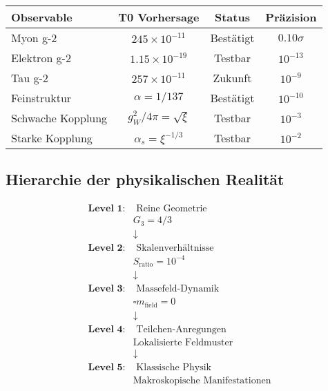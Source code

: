 \documentclass[12pt,a4paper]{article}
\begin{document}
	\begin{center}
		\begin{tabular}{|l|c|c|c|}
			\hline
			\textbf{Observable} & \textbf{T0 Vorhersage} & \textbf{Status} & \textbf{Präzision} \\
			\hline
			Myon g-2 & $245 \times 10^{-11}$ & Bestätigt & $0.10\sigma$ \\
			Elektron g-2 & $1.15 \times 10^{-19}$ & Testbar & $10^{-13}$ \\
			Tau g-2 & $257 \times 10^{-11}$ & Zukunft & $10^{-9}$ \\
			Feinstruktur & $\alpha = 1/137$ & Bestätigt & $10^{-10}$ \\
			Schwache Kopplung & $g_W^2/4\pi = \sqrt{\xi}$ & Testbar & $10^{-3}$ \\
			Starke Kopplung & $\alpha_s = \xi^{-1/3}$ & Testbar & $10^{-2}$ \\
			\hline
		\end{tabular}
	\end{center}
	
	\subsection{Hierarchie der physikalischen Realität}
	
	\begin{align}
		\textbf{Level 1:} &\text{ Reine Geometrie} \nonumber \\
		&G_3 = 4/3 \nonumber \\
		&\downarrow \nonumber \\
		\textbf{Level 2:} &\text{ Skalenverhältnisse} \nonumber \\
		&S_{\text{ratio}} = 10^{-4} \nonumber \\
		&\downarrow \nonumber \\
		\textbf{Level 3:} &\text{ Massefeld-Dynamik} \nonumber \\
		&\square m_{\text{field}} = 0 \nonumber \\
		&\downarrow \nonumber \\
		\textbf{Level 4:} &\text{ Teilchen-Anregungen} \nonumber \\
		&\text{Lokalisierte Feldmuster} \nonumber \\
		&\downarrow \nonumber \\
		\textbf{Level 5:} &\text{ Klassische Physik} \nonumber \\
		&\text{Makroskopische Manifestationen} \nonumber
	\end{align}
	
\end{document}
